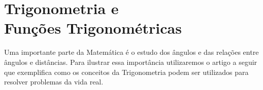\chapter[Trigonometria e Funções Trigonométricas]%
        {Trigonometria e\\Funções Trigonométricas}
\label{cap:trigonometria_e_funcoes_trigonometricas}

\minitoc

Uma importante parte da Matemática é o estudo dos ângulos e das relações entre
ângulos e distâncias. Para ilustrar essa importância utilizaremos o artigo a
seguir que exemplifica como os conceitos da Trigonometria podem ser utilizados
para resolver problemas da vida real.














